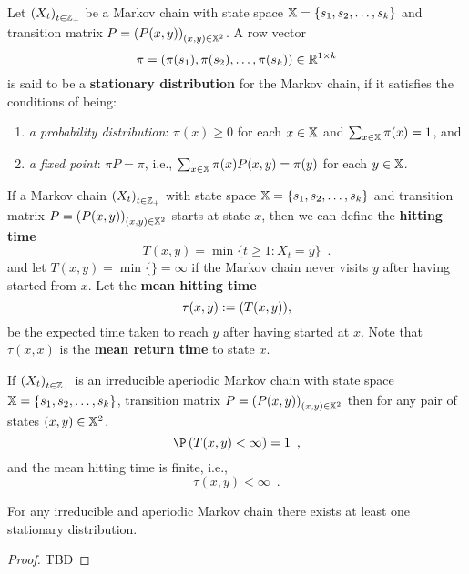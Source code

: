 \begin{definition}
Let $\left( X_t \right)_{t \in \mathbb{Z}_+}$ be a Markov chain with state space $\mathbb{X}=\{s_1,s_2,\ldots,s_k\}$ and transition matrix $P = \left( P(x,y) \right)_{(x,y) \in \mathbb{X}^2}$.  A row vector $$\pi = \left( \pi(s_1), \pi(s_2), \ldots, \pi(s_k) \right) \in \mathbb{R}^{1\times k}$$ is said to be a {\bf stationary distribution} for the Markov chain, if it satisfies the conditions of being:
\begin{enumerate}
\item {\em a probability distribution}: $\pi(x) \geq 0$ for each $x \in \mathbb{X}$ and $\sum_{x \in \mathbb{X}} \pi(x) = 1$, and
\item {\em a fixed point}: $\pi P = \pi$, i.e., $\sum_{x \in \mathbb{X}} \pi(x) P(x,y) = \pi(y)$ for each $y \in \mathbb{X}$.
\end{enumerate}
\end{definition}

\begin{definition}
If a Markov chain $\left( X_t \right)_{t \in \mathbb{Z}_+}$ with state space $\mathbb{X}=\{s_1,s_2,\ldots,s_k\}$ and transition matrix $P = \left( P(x,y) \right)_{(x,y) \in \mathbb{X}^2}$ starts at state $x$, then we can define the {\bf hitting time}
\[
T(x,y) = \min \{ t \geq 1: X_t = y \} \enspace .
\]
and let $T(x,y) = \min \{\} = \infty$ if the Markov chain never visits $y$ after having started from $x$.  Let the {\bf  mean hitting time} 
\[
\tau(x,y) := \mathscr{(}T(x,y)) ,
\]
be the expected time taken to reach $y$ after having started at $x$.  Note that $\tau(x,x)$ is the {\bf mean return time} to state $x$.
\end{definition}

\begin{prop}  
If  $\left( X_t \right)_{t \in \mathbb{Z}_+}$ is an irreducible aperiodic Markov chain with state space $\mathbb{X}=\{s_1,s_2,\ldots,s_k\}$, transition matrix $P = \left( P(x,y) \right)_{(x,y) \in \mathbb{X}^2}$ then for any pair of states ${(x,y) \in \mathbb{X}^2}$,
\[
\P\left( T(x,y) < \infty \right) = 1 \enspace ,
\]
and the mean hitting time is finite, i.e.,
\[
\tau(x,y) < \infty \enspace .
\]
\end{prop}

\begin{prop}
For any irreducible and aperiodic Markov chain there exists at least one stationary distribution.
\begin{proof}
TBD
\end{proof}
\end{prop}


